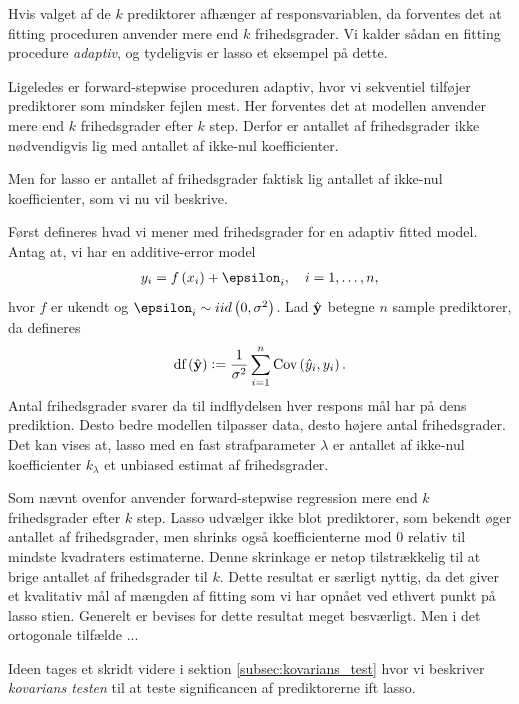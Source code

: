 Hvis valget af de \(k\) prediktorer afhænger af responsvariablen, da forventes det at fitting proceduren anvender mere end \(k\) frihedsgrader. 
Vi kalder sådan en fitting procedure \textit{adaptiv}, og tydeligvis er lasso et eksempel på dette.

Ligeledes er forward-stepwise proceduren adaptiv, hvor vi sekventiel tilføjer prediktorer som mindsker fejlen mest.
Her forventes det at modellen anvender mere end \(k\) frihedsgrader efter \(k\) step.
Derfor er antallet af frihedsgrader ikke nødvendigvis lig med antallet af ikke-nul koefficienter.

Men for lasso er antallet af frihedsgrader faktisk lig antallet af ikke-nul koefficienter, som vi nu vil beskrive.

Først defineres hvad vi mener med frihedsgrader for en adaptiv fitted model. 
Antag at, vi har en additive-error model
\begin{align*}
y_i = f \del{x_i} + \epsilon_i, \quad i = 1, \ldots, n,
\end{align*}
hvor \(f\) er ukendt og \(\epsilon_i \sim iid \del{0, \sigma^2}\).
Lad \(\hat{\mathbf{y}}\) betegne \(n\) sample prediktorer, da defineres 
\begin{align*}
\text{df}\del{\hat{\y}} := \frac{1}{\sigma^2} \sum_{i=1}^n \text{Cov}\del{\hat{y}_i, y_i}.
\end{align*}
Antal frihedsgrader svarer da til indflydelsen hver respons mål har på dens prediktion.
Desto bedre modellen tilpasser data, desto højere antal frihedsgrader.
Det kan vises at, lasso med en fast strafparameter \(\lambda\) er antallet af ikke-nul koefficienter \(k_\lambda\) et unbiased estimat af frihedsgrader.

Som nævnt ovenfor anvender forward-stepwise regression mere end \(k\) frihedsgrader efter \(k\) step.
Lasso udvælger ikke blot prediktorer, som bekendt øger antallet af frihedsgrader, men shrinks også koefficienterne mod 0 relativ til mindste kvadraters estimaterne.
Denne skrinkage er netop tilstrækkelig til at brige antallet af frihedsgrader til \(k\).
Dette resultat er særligt nyttig, da det giver et kvalitativ mål af mængden af fitting som vi har opnået ved ethvert punkt på lasso stien.
Generelt er bevises for dette resultat meget besværligt.
Men i det ortogonale tilfælde ...

Ideen tages et skridt videre i sektion \ref{subsec:kovarians_test} hvor vi beskriver \textit{kovarians testen} til at teste significancen af prediktorerne ift lasso.


